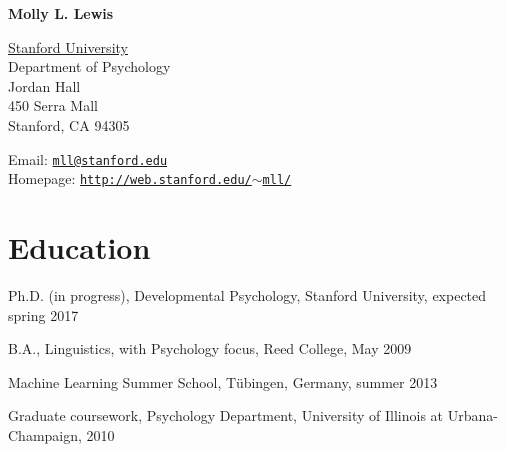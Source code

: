 \documentclass[letterpaper]{article}
\def\name{Molly L.  Lewis}
\renewenvironment{itemize}{
  \begin{list}{}{
    \setlength{\leftmargin}{1.5em}
  }
}{
  \end{list}
}
\begin{document}
\centerline{\huge \bf \name}
\vspace{0.25in}


 \normalsize
  \href{http://www.stanford.edu/}{Stanford University} \\
  Department of Psychology \\
  Jordan Hall\\
  450 Serra Mall \\
  Stanford, CA 94305\\
  
  \begin{minipage}{0.45\linewidth}
Email: \href{mailto:mll@stanford.edu}{\tt mll@stanford.edu}\\
Homepage: \href{http://web.stanford.edu/~mll/}{\tt http://web.stanford.edu/$\sim$mll/}\\
 
\end{minipage}


\section*{Education}

\begin{itemize}
  \item Ph.D. (in progress), Developmental Psychology, Stanford University, expected spring 2017

  \item B.A., Linguistics, with Psychology focus, Reed College, May 2009
    \item Machine Learning Summer School, T\"{u}bingen, Germany, summer 2013 

    \item Graduate coursework, Psychology Department, University of Illinois at Urbana-Champaign, 2010

  

\end{itemize}

\end{document}
